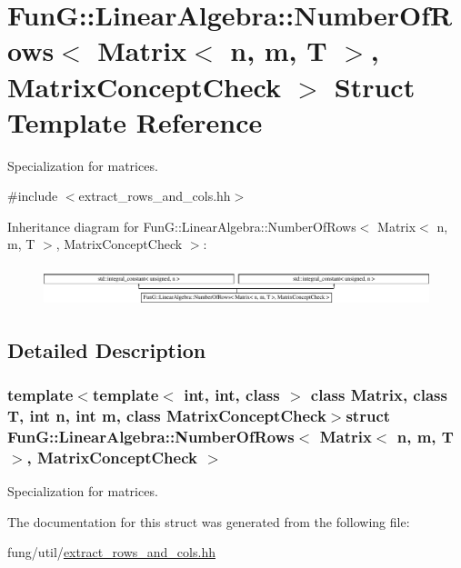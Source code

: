 \hypertarget{structFunG_1_1LinearAlgebra_1_1NumberOfRows_3_01Matrix_3_01n_00_01m_00_01T_01_4_00_01MatrixConceptCheck_01_4}{\section{\-Fun\-G\-:\-:\-Linear\-Algebra\-:\-:\-Number\-Of\-Rows$<$ \-Matrix$<$ n, m, \-T $>$, \-Matrix\-Concept\-Check $>$ \-Struct \-Template \-Reference}
\label{structFunG_1_1LinearAlgebra_1_1NumberOfRows_3_01Matrix_3_01n_00_01m_00_01T_01_4_00_01MatrixConceptCheck_01_4}
}


\-Specialization for matrices.  




{\ttfamily \#include $<$extract\-\_\-rows\-\_\-and\-\_\-cols.\-hh$>$}

\-Inheritance diagram for \-Fun\-G\-:\-:\-Linear\-Algebra\-:\-:\-Number\-Of\-Rows$<$ \-Matrix$<$ n, m, \-T $>$, \-Matrix\-Concept\-Check $>$\-:\begin{figure}[H]
\begin{center}
\leavevmode
\includegraphics[height=1.159420cm]{structFunG_1_1LinearAlgebra_1_1NumberOfRows_3_01Matrix_3_01n_00_01m_00_01T_01_4_00_01MatrixConceptCheck_01_4}
\end{center}
\end{figure}


\subsection{\-Detailed \-Description}
\subsubsection*{template$<$template$<$ int, int, class $>$ class \-Matrix, class T, int n, int m, class Matrix\-Concept\-Check$>$struct Fun\-G\-::\-Linear\-Algebra\-::\-Number\-Of\-Rows$<$ Matrix$<$ n, m, T $>$, Matrix\-Concept\-Check $>$}

\-Specialization for matrices. 

\-The documentation for this struct was generated from the following file\-:\begin{DoxyCompactItemize}
\item 
fung/util/\hyperlink{extract__rows__and__cols_8hh}{extract\-\_\-rows\-\_\-and\-\_\-cols.\-hh}\end{DoxyCompactItemize}
